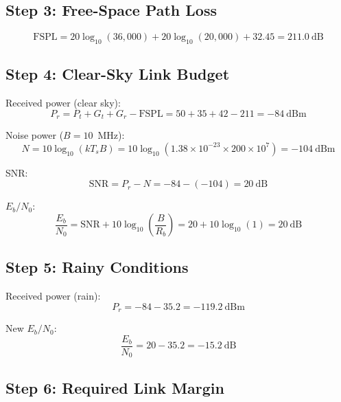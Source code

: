 \subsection*{Step 3: Free-Space Path Loss}

\begin{equation}
\text{FSPL} = 20\log_{10}(36{,}000) + 20\log_{10}(20{,}000) + 32.45 = 211.0~\text{dB}
\end{equation}

\subsection*{Step 4: Clear-Sky Link Budget}

Received power (clear sky):
\begin{equation}
P_r = P_t + G_t + G_r - \text{FSPL} = 50 + 35 + 42 - 211 = -84~\text{dBm}
\end{equation}

Noise power ($B = 10$~MHz):
\begin{equation}
N = 10\log_{10}(kT_sB) = 10\log_{10}(1.38 \times 10^{-23} \times 200 \times 10^7) = -104~\text{dBm}
\end{equation}

SNR:
\begin{equation}
\text{SNR} = P_r - N = -84 - (-104) = 20~\text{dB}
\end{equation}

$E_b/N_0$:
\begin{equation}
\frac{E_b}{N_0} = \text{SNR} + 10\log_{10}\left(\frac{B}{R_b}\right) = 20 + 10\log_{10}(1) = 20~\text{dB}
\end{equation}

\subsection*{Step 5: Rainy Conditions}

Received power (rain):
\begin{equation}
P_r = -84 - 35.2 = -119.2~\text{dBm}
\end{equation}

New $E_b/N_0$:
\begin{equation}
\frac{E_b}{N_0} = 20 - 35.2 = -15.2~\text{dB}
\end{equation}

\subsection*{Step 6: Required Link Margin}

